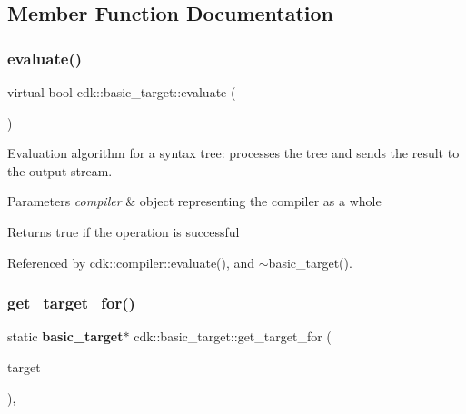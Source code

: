 \subsection{Member Function Documentation}
\mbox{\label{classcdk_1_1basic__target_a0db773c9c4f84a36df0949187aab9adb}} 
\subsubsection{evaluate()}
{\footnotesize\ttfamily virtual bool cdk\+::basic\+\_\+target\+::evaluate (\begin{DoxyParamCaption}\item[{std\+::shared\+\_\+ptr$<$ \textbf{ compiler} $>$}]{ }\end{DoxyParamCaption})\hspace{0.3cm}{\ttfamily [pure virtual]}}

Evaluation algorithm for a syntax tree\+: processes the tree and sends the result to the output stream. 
\begin{DoxyParams}{Parameters}
{\em compiler} & object representing the compiler as a whole \\
\hline
\end{DoxyParams}
\begin{DoxyReturn}{Returns}
true if the operation is successful 
\end{DoxyReturn}


Referenced by cdk\+::compiler\+::evaluate(), and $\sim$basic\+\_\+target().

\mbox{\label{classcdk_1_1basic__target_a50126c8601a5b82dcce46e43d4258064}} 
\subsubsection{get\+\_\+target\+\_\+for()}
{\footnotesize\ttfamily static \textbf{ basic\+\_\+target}$\ast$ cdk\+::basic\+\_\+target\+::get\+\_\+target\+\_\+for (\begin{DoxyParamCaption}\item[{const std\+::string \&}]{target }\end{DoxyParamCaption})\hspace{0.3cm}{\ttfamily [inline]}, {\ttfamily [static]}}

